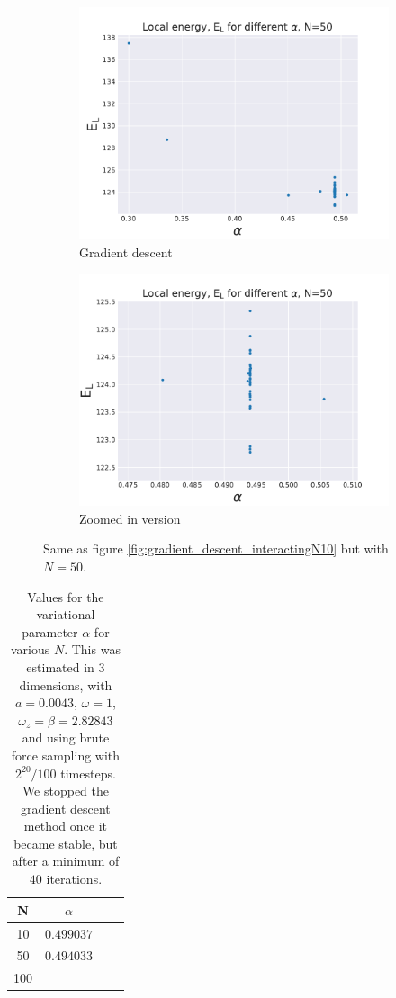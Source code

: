 \documentclass[a4paper, 10pt]{article}
\begin{document}
				\begin{figure}[ht!]
					\centering
					\centering
					\begin{subfigure}{.5\textwidth}
						\centering
						\includegraphics[width=.8\linewidth]{../Results/E_v_alpha_gradientN50.pdf}
						\caption{Gradient descent}
					\end{subfigure}%
					\begin{subfigure}{.5\textwidth}
						\centering
						\includegraphics[width=.8\linewidth]{../Results/E_v_alpha_gradientN50Zoom.pdf}
						\caption{Zoomed in version}
					\end{subfigure}
					\caption{Same as figure \ref{fig:gradient_descent_interactingN10} but with $N=50$. }\label{fig:gradient_descent_interactingN50}
				\end{figure}
		
			\begin{table}[ht!]
				\centering
				\begin{tabular}{cccc}
					N & $\alpha$\\
					\hline
					10 & $0.499037$\\
					50 &$0.494033$\\ 
					100 & 
				\end{tabular}
				\caption{Values for the variational parameter $\alpha$ for various $N$. This was estimated in 3 dimensions, with $a=0.0043$, $\omega=1$, $\omega_z=\beta=2.82843$ and using brute force sampling with $2^{20}/100$ timesteps. We stopped the gradient descent method once it became stable, but after a minimum of $40$ iterations.}\label{tab:correct_alpha_interacting}
		\end{table}
\end{document}
